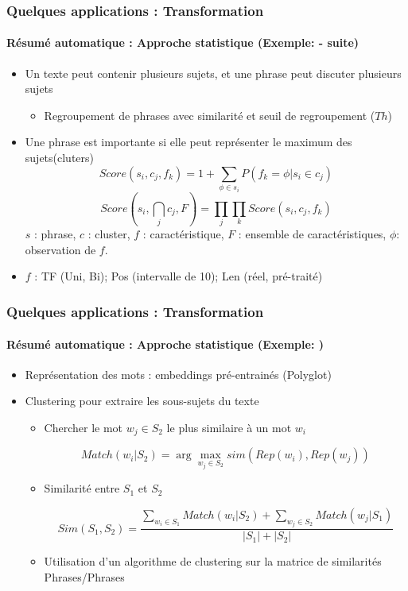 \documentclass[xcolor=table]{beamer}
\begin{document}
\begin{frame}
	\frametitle{Quelques applications : Transformation}
	\framesubtitle{Résumé automatique : Approche statistique (Exemple: \cite{13-aries-al} - suite)}
	
	\begin{itemize}
		\item Un texte peut contenir plusieurs sujets, et une phrase peut discuter plusieurs sujets
		\begin{itemize}
			\item Regroupement de phrases avec similarité et seuil de regroupement ($Th$)
		\end{itemize}
		\item Une phrase est importante si elle peut représenter le maximum des sujets(cluters)
		\[ Score(s_i , c_j , f_k ) = 1 + \sum_{\phi \in s_i} {P(f_k=\phi | s_i \in c_j)} \]
		\[ Score(s_i , \bigcap_{j} c_j , F) =  %
		\prod_{j} \prod_{k} Score(s_i , c_j , f_k ) \]
		$ s $ : phrase, $ c $ : cluster, $ f $ : caractéristique, $ F $ : ensemble de caractéristiques, $ \phi $: observation de $ f $.
		\item $f$ : TF (Uni, Bi); Pos (intervalle de 10); Len (réel, pré-traité)
	\end{itemize}
	
\end{frame}

\begin{frame}
	\frametitle{Quelques applications : Transformation}
	\framesubtitle{Résumé automatique : Approche statistique (Exemple: \cite{15-oufaida-al})}
	\begin{itemize}
		\item Représentation des mots : embeddings pré-entrainés (Polyglot)
		\item Clustering pour extraire les sous-sujets du texte
		\begin{itemize}
			\item Chercher le mot $w_j \in S_2$ le plus similaire à un mot $w_i$
			
			\[Match(w_i | S_2) = \arg\max_{w_j \in S_2} sim(Rep(w_i), Rep(w_j))\]
			
			\item Similarité entre $S_1$ et $S_2$
			
			\[Sim(S_1, S_2) = \frac{\sum_{w_i \in S_1} Match(w_i | S_2) + \sum_{w_j \in S_2} Match(w_j | S_1)}{|S_1| + |S_2|}\]
			
			\item Utilisation d'un algorithme de clustering sur la matrice de similarités Phrases/Phrases
		\end{itemize}
	
	\end{itemize}
	
\end{frame}
\end{document}
